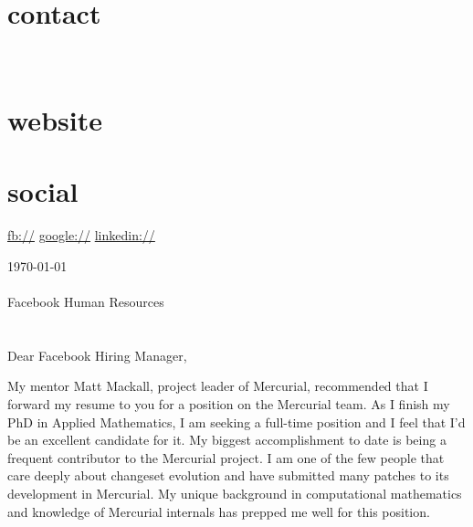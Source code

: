 \documentclass[]{fancy-cv}
\begin{document}

\begin{aside}
  \section{contact}
    \href{mailto:\myemail}{\myemail}
    ~
    \myphone
    ~
    \myaddress
    \mycity
  \section{website}
    \href{\mywebsite}{\mywebsite}
  \section{social}
    \href{http://facebook.com/\myfb}{fb://\myfb}
    \href{http://plug.google.com/\mygp}{google://\mygp}
    \href{http://www.linkedin.com/in/\mylinkedin}{linkedin://\mylinkedin}
\end{aside}

\vspace{.8em}
\large
\today\\
\\
Facebook Human Resources\\
\\
\\
Dear Facebook Hiring Manager,

My mentor Matt Mackall, project leader of Mercurial, recommended that I forward
my resume to you for a position on the Mercurial team. As I finish my PhD in
Applied Mathematics, I am seeking a full-time position and I feel that I’d be
an excellent candidate for it.
%
\newline\newline
%
My biggest accomplishment to date is being a frequent contributor to the
Mercurial project. I am one of the few people that care deeply about changeset
evolution and have submitted many patches to its development in Mercurial. My
unique background in computational mathematics and knowledge of Mercurial
internals has prepped me well for this position.
\end{document}
